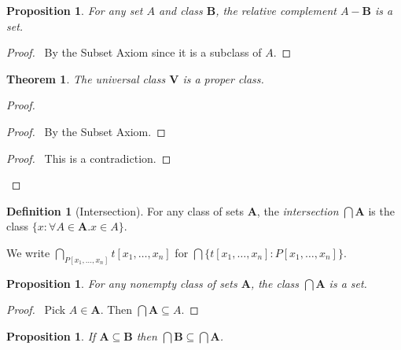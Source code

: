 \documentclass{article}
\let\qed\relax
\newtheorem{proposition}[axiom]{Proposition}
\newtheorem{theorem}[axiom]{Theorem}
\theoremstyle{definition}
\newtheorem{definition}[axiom]{Definition}
\begin{document}
    \begin{proposition}
        For any set $A$ and class $\mathbf{B}$, the relative complement $A - \mathbf{B}$ is a set.
    \end{proposition}

    \begin{proof}
        \pf\ By the Subset Axiom since it is a subclass of $A$. \qed
    \end{proof}

    \begin{theorem}
        The universal class $\mathbf{V}$ is a proper class.
    \end{theorem}

    \begin{proof}
        \pf
        \begin{proof}
            \pf\ By the Subset Axiom.
        \end{proof}
        \qedstep
        \begin{proof}
            \pf\ This is a contradiction.
        \end{proof}
        \qed
    \end{proof}
    
    \begin{definition}[Intersection]
        For any class of sets $\mathbf{A}$, the \emph{intersection} $\bigcap \mathbf{A}$ is the class
        $\{ x : \forall A \in \mathbf{A}. x \in A \}$.

        We write $\bigcap_{P[x_1, \ldots, x_n]} t[x_1, \ldots, x_n]$ for $\bigcap \{ t[x_1, \ldots, x_n]
        : P[x_1, \ldots, x_n] \}$.
    \end{definition}

    \begin{proposition}
        For any nonempty class of sets $\mathbf{A}$, the class $\bigcap \mathbf{A}$ is a set.
    \end{proposition}

    \begin{proof}
        \pf\ Pick $A \in \mathbf{A}$. Then $\bigcap \mathbf{A} \subseteq A$. \qed
    \end{proof}
    
    \begin{proposition}
        If $\mathbf{A} \subseteq \mathbf{B}$ then $\bigcap \mathbf{B} \subseteq \bigcap \mathbf{A}$.
    \end{proposition}
\end{document}
